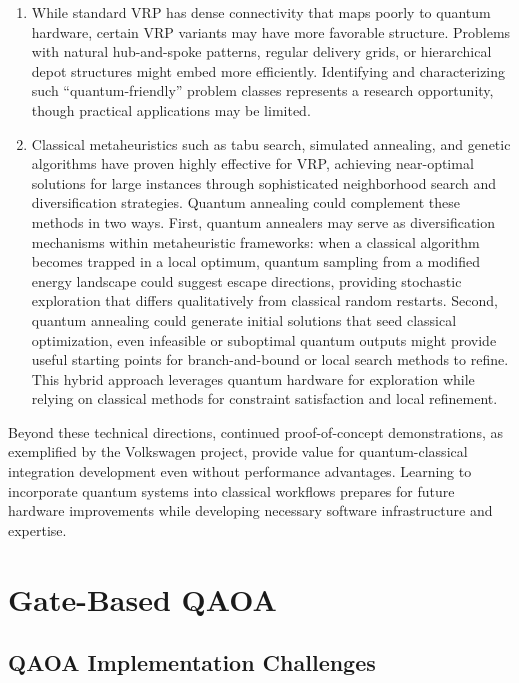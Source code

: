 \documentclass[preprint,3p,12pt,authoryear]{elsarticle}
\begin{document}
\begin{enumerate}
\item While standard VRP has dense connectivity that maps poorly to quantum hardware, certain VRP variants may have more favorable structure. Problems with natural hub-and-spoke patterns, regular delivery grids, or hierarchical depot structures might embed more efficiently. Identifying and characterizing such ``quantum-friendly'' problem classes represents a research opportunity, though practical applications may be limited.

\item Classical metaheuristics such as tabu search, simulated annealing, and genetic algorithms have proven highly effective for VRP, achieving near-optimal solutions for large instances through sophisticated neighborhood search and diversification strategies. Quantum annealing could complement these methods in two ways. First, quantum annealers may serve as diversification mechanisms within metaheuristic frameworks: when a classical algorithm becomes trapped in a local optimum, quantum sampling from a modified energy landscape could suggest escape directions, providing stochastic exploration that differs qualitatively from classical random restarts. Second, quantum annealing could generate initial solutions that seed classical optimization, even infeasible or suboptimal quantum outputs might provide useful starting points for branch-and-bound or local search methods to refine. This hybrid approach leverages quantum hardware for exploration while relying on classical methods for constraint satisfaction and local refinement.
\end{enumerate}

Beyond these technical directions, continued proof-of-concept demonstrations, as exemplified by the Volkswagen project, provide value for quantum-classical integration development even without performance advantages. Learning to incorporate quantum systems into classical workflows prepares for future hardware improvements while developing necessary software infrastructure and expertise.

\section{Gate-Based QAOA}\label{sec:gatebased}

\subsection{QAOA Implementation Challenges}
\end{document}
